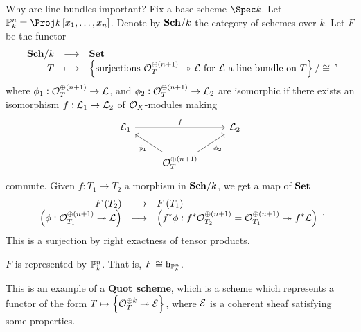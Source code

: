 Why are line bundles important? Fix a base scheme $ \Spec k $. Let $ \PP_k^n = \Proj k\sbr{x_1, \dots, x_n} $. Denote by $ \textbf{Sch} / k $ the category of schemes over $ k $. Let $ F $ be the functor
$$ \function{\Sch / k}{\Set}{T}{\cbr{\text{surjections} \ \OOO_T^{\oplus \br{n + 1}} \twoheadrightarrow \LLL \ \text{for} \ \LLL \ \text{a line bundle on} \ T} / \cong}, $$
where $ \phi_1 : \OOO_T^{\oplus \br{n + 1}} \to \LLL $, and $ \phi_2 : \OOO_T^{\oplus \br{n + 1}} \to \LLL_2 $ are isomorphic if there exists an isomorphism $ f : \mathcal{L}_1 \to \mathcal{L}_2 $ of $ \mathcal{O}_X $-modules making
$$
\begin{tikzcd}
\LLL_1 \arrow{rr}{f} & & \LLL_2 \\
& \OOO_T^{\oplus \br{n + 1}} \arrow{ul}{\phi_1} \arrow{ur}[swap]{\phi_2} &
\end{tikzcd}
$$
commute. Given $ f : T_1 \to T_2 $ a morphism in $ \textbf{Sch} / k $, we get a map of $ \textbf{Set} $
$$ \function{F\br{T_2}}{F\br{T_1}}{\br{\phi : \OOO_{T_1}^{\oplus \br{n + 1}} \twoheadrightarrow \LLL}}{\br{f^*\phi : f^*\OOO_{T_2}^{\oplus \br{n + 1}} = \OOO_{T_1}^{\oplus \br{n + 1}} \twoheadrightarrow f^*\LLL}}. $$
This is a surjection by right exactness of tensor products.

\pagebreak

\begin{theorem}
$ F $ is represented by $ \mathbb{P}_k^n $. That is, $ F \cong \mathrm{h}_{\mathbb{P}_k^n} $.
\end{theorem}

\begin{remark*}
This is an example of a \textbf{Quot scheme}, which is a scheme which represents a functor of the form $ T \mapsto \cbr{\OOO_T^{\oplus k} \twoheadrightarrow \EEE} $, where $ \mathcal{E} $ is a coherent sheaf satisfying some properties.
\end{remark*}


